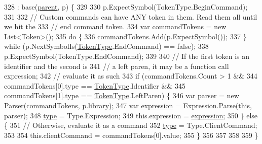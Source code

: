 \begin{DoxyCode}
328                                                                : base(\hyperlink{a00120_af313a82103fcc2ff5a177dbb06b92f7b}{parent}, p) \{
329 
330                 p.ExpectSymbol(TokenType.BeginCommand);
331 
332                 \textcolor{comment}{// Custom commands can have ANY token in them. Read them all until we hit the}
333                 \textcolor{comment}{// end command token.}
334                 var commandTokens = \textcolor{keyword}{new} List<Token>();
335                 \textcolor{keywordflow}{do} \{
336                     commandTokens.Add(p.ExpectSymbol());
337                 \} \textcolor{keywordflow}{while} (p.NextSymbolIs(\hyperlink{a00029_a301aa7c866593a5b625a8fc158bbeace}{TokenType}.EndCommand) == \textcolor{keyword}{false});
338                 p.ExpectSymbol(TokenType.EndCommand);
339 
340                 \textcolor{comment}{// If the first token is an identifier and the second is}
341                 \textcolor{comment}{// a left paren, it may be a function call expression;}
342                 \textcolor{comment}{// evaluate it as such}
343                 \textcolor{keywordflow}{if} (commandTokens.Count > 1 && 
344                     commandTokens[0].type == \hyperlink{a00029_a301aa7c866593a5b625a8fc158bbeace}{TokenType}.Identifier &&
345                     commandTokens[1].type == \hyperlink{a00029_a301aa7c866593a5b625a8fc158bbeace}{TokenType}.LeftParen) \{            
346                     var parser = \textcolor{keyword}{new} \hyperlink{a00121_acd2714b911fb5e7c38f0e07a9dc1af58}{Parser}(commandTokens, p.library);
347                     var \hyperlink{a00061_a4250d192d5b58e2404a14c68eb616f16}{expression} = Expression.Parse(\textcolor{keyword}{this}, parser);
348                     \hyperlink{a00061_a5ef3bc96812be224d91548bfcdfd4b92}{type} = Type.Expression;
349                     this.expression = \hyperlink{a00061_a4250d192d5b58e2404a14c68eb616f16}{expression};
350                 \} \textcolor{keywordflow}{else} \{
351                     \textcolor{comment}{// Otherwise, evaluate it as a command}
352                     \hyperlink{a00061_a5ef3bc96812be224d91548bfcdfd4b92}{type} = Type.ClientCommand;
353 
354                     this.clientCommand = commandTokens[0].value;
355                 \}
356 
357 
358 
359             \}
\end{DoxyCode}


